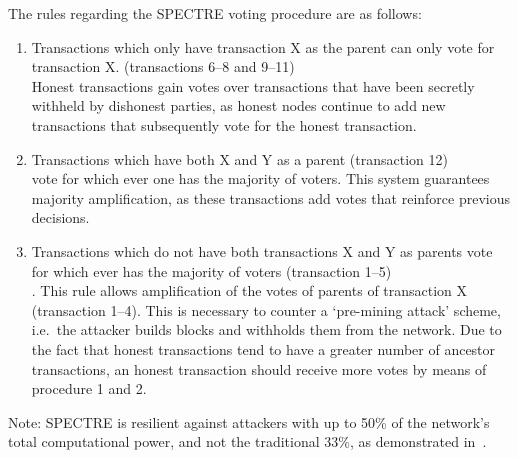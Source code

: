 \documentclass[a4paper,10pt,twocolumn]{article}
\begin{document}
 The rules regarding the SPECTRE voting procedure are as follows:

 \vspace{-0.5\baselineskip}
 \begin{enumerate}
	 \setlength\itemsep{0em}
\item Transactions which only have transaction X as the parent can only vote for transaction X. (transactions 6--8 and 9--11) \\
Honest transactions gain votes over transactions that have been secretly withheld by dishonest parties, as honest nodes continue to add 
new transactions that subsequently vote for the honest transaction.
 \item Transactions which have both X and Y as a parent (transaction 12)\\ vote for which ever one has the majority of voters.
This system guarantees majority amplification, as these transactions add votes that reinforce previous decisions. 
 \item  Transactions which do not have both transactions X and Y as parents vote for which ever has the majority of voters (transaction 
 1--5)\\.
 This rule allows amplification of the votes of parents of transaction X (transaction 1--4). This is necessary to counter a `pre-mining 
 attack' scheme, i.e.\ the attacker builds blocks and withholds them from the network. Due to the fact that honest transactions tend to 
 have a greater number of ancestor transactions, an honest transaction should receive more votes by means of procedure 1 and 2.
 \end{enumerate}

Note: SPECTRE is resilient against attackers with up to 50\% of the network's total computational power, and not the traditional 33\%, 
as demonstrated in~\cite{spectre}.
\end{document}
